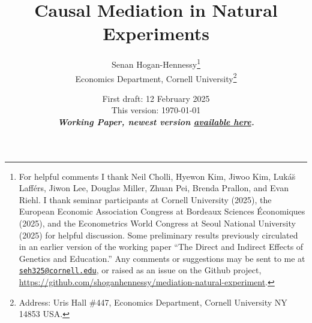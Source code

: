 \documentclass[notitlepage,12pt]{article}
\author{Senan Hogan-Hennessy\thanks{
    For helpful comments I thank
    Neil Cholli,
    Hyewon Kim,
    Jiwoo Kim,
    Luk\'a\u{s} Laff\'ers,
    Jiwon Lee,
    Douglas Miller,
    Zhuan Pei,
    Brenda Prallon,
    and
    Evan Riehl.
    I thank seminar participants at Cornell University (2025), the European Economic Association Congress at Bordeaux Sciences \'Economiques (2025), and the Econometrics World Congress at Seoul National University (2025)
    for helpful discussion.
    Some preliminary results previously circulated in an earlier version of the working paper ``The Direct and Indirect Effects of Genetics and Education.''
    Any comments or suggestions may be sent to me at \href{mailto:seh325@cornell.edu}{\nolinkurl{seh325@cornell.edu}}, or raised as an issue on the Github project,
    \url{https://github.com/shoganhennessy/mediation-natural-experiment}.
    } \\
    \vspace{0.1cm}
    Economics Department, Cornell University\footnote{
        Address: Uris Hall \#447, Economics Department, Cornell University NY 14853 USA.
    }
}
\title{Causal Mediation in Natural Experiments}
\date{
    First draft: 12 February 2025 \\
    This version:
    \today \\ \vspace{0.25cm}
    \textbf{\textit{Working Paper,
    newest version
    \href{https://raw.githubusercontent.com/shoganhennessy/mediation-natural-experiment/main/mediation-natural-experiment-2025.pdf}{available here}.}}
    \vspace{-1.0cm}
}
\begin{document}
\clearpage
\maketitle
\thispagestyle{empty}
\begin{abstract}
    
\end{abstract}

\newpage
\setcounter{page}{1}
\onehalfspacing
\noindent









\singlespacing


\newpage

\end{document}
